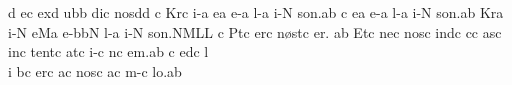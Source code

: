 \spatium
\divisiofinalis
\spatium
{}\punctum d\egn
\sgn {}e{}\punctum c\egn
\spatium
\sgn {}ex\punctum d\egn
\sgn {}{\a}u\bmolle b\punctum b\egn
\sgn di{}\punctum c\egn
\spatium
\sgn nos\punctum d\augmentum d\egn
\spatium
\divisiofinalis
\spatium\custos c\lineaproxima
\sgn K{\y}r\punctum c\egn
\sgn {}i-\punctum a\egn
\sgn {}e{}\engl{}\punctum a\egn
\spatium
\sgn {}e-\punctum a\egn
\sgn l{\e}-\punctum a\egn
\sgn {}i-\punctum N\egn
\sgn so{n.}\punctum a\augmentum b\egn
\spatium
\divisiofinalis
\spatium
{}\punctum c\egn
\sgn {}e{}\punctum a\egn
\spatium
\sgn {}e-\punctum a\egn
\sgn l{\e}-\punctum a\egn
\sgn {}i-\punctum N\egn
\sgn so{n.}\punctum a\augmentum b\egn
\spatium
\divisiofinalis
\spatium
\sgn K{\y}r\punctum a\egn
\sgn {}i-\punctum N\egn
\sgn {}e{}\engl{}\pes Ma\egn
\spatium
\sgn {}e-\bmolle b\clivis bN\egn
\sgn l{\e}-\punctum a\egn
\sgn {}i-\punctum N\egn
\sgn so{n.}\climacus NML\augmentum L\egn
\spatium\divisiofinalis\custos c\lineaproxima
\sgn P{\a}t\punctum c\egn
\sgn {}er\punctum c\egn
\spatium
\sgn n{\o}{st}\punctum c\egn
\sgn {}e{r.   }\punctum a\augmentum b\egn
\spatium
\divisiofinalis
\spatium
{}Et\punctum c\egn
\spatium
\sgn ne{}\punctum c\egn
\spatium
\sgn nos\punctum c\egn
\spatium
\sgn {}i{nd}\punctum c\egn
\sgn {}{\u}c\punctum c\egn
\sgn {}as\punctum c\egn
\spatium
\sgn {}in\punctum c\egn
\spatium
\sgn te{nt}\punctum c\egn
\sgn {}at\punctum c\egn
\sgn {}i-\punctum c\egn
\sgn {}{\o}n\punctum c\egn
\sgn {}e{m.}\punctum a\augmentum b\egn
\spatium\divisiofinalis\custos c\lineaproxima
{}ed\punctum c\egn
\spatium
\sgn l{\\i }b\punctum c\egn
\sgn {}er\punctum c\egn
\sgn {}a{}\punctum c\egn
\spatium
\sgn nos\punctum c\egn
\spatium 
\sgn {}a{}\punctum c\egn
\spatium
\sgn m{\a}-\punctum c\egn
\sgn lo.\punctum a\augmentum b\egn
\setemptybar
\Finisgregoriana

\bigskip